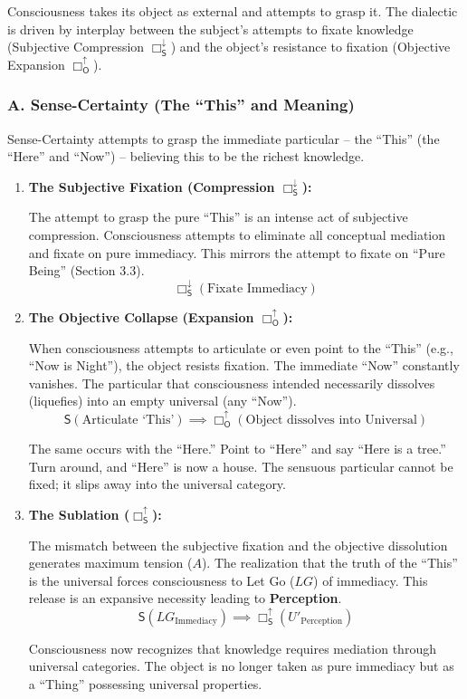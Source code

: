 \documentclass[12pt]{book}
\newcommand{\SBoxUp}{\Box_{\mathsf{S}}^{\uparrow}}
\newcommand{\SBoxDown}{\Box_{\mathsf{S}}^{\downarrow}}
\newcommand{\OBoxUp}{\Box_{\mathsf{O}}^{\uparrow}}
\begin{document}
Consciousness takes its object as external and attempts to grasp it. The dialectic is driven by interplay between the subject's attempts to fixate knowledge (Subjective Compression $\SBoxDown$) and the object's resistance to fixation (Objective Expansion $\OBoxUp$).

\subsubsection{A. Sense-Certainty (The ``This'' and Meaning)}

Sense-Certainty attempts to grasp the immediate particular -- the ``This'' (the ``Here'' and ``Now'') -- believing this to be the richest knowledge.

\begin{enumerate}
\item \textbf{The Subjective Fixation (Compression $\SBoxDown$):}

The attempt to grasp the pure ``This'' is an intense act of subjective compression. Consciousness attempts to eliminate all conceptual mediation and fixate on pure immediacy. This mirrors the attempt to fixate on ``Pure Being'' (Section 3.3).
\[
\SBoxDown(\text{Fixate Immediacy})
\]

\item \textbf{The Objective Collapse (Expansion $\OBoxUp$):}

When consciousness attempts to articulate or even point to the ``This'' (e.g., ``Now is Night''), the object resists fixation. The immediate ``Now'' constantly vanishes. The particular that consciousness intended necessarily dissolves (liquefies) into an empty universal (any ``Now'').
\[
\mathsf{S}(\text{Articulate `This'}) \implies \OBoxUp(\text{Object dissolves into Universal})
\]

The same occurs with the ``Here.'' Point to ``Here'' and say ``Here is a tree.'' Turn around, and ``Here'' is now a house. The sensuous particular cannot be fixed; it slips away into the universal category.

\item \textbf{The Sublation ($\SBoxUp$):}

The mismatch between the subjective fixation and the objective dissolution generates maximum tension ($A$). The realization that the truth of the ``This'' is the universal forces consciousness to Let Go ($LG$) of immediacy. This release is an expansive necessity leading to \textbf{Perception}.
\[
\mathsf{S}(LG_{\text{Immediacy}}) \implies \SBoxUp(U'_{\text{Perception}})
\]

Consciousness now recognizes that knowledge requires mediation through universal categories. The object is no longer taken as pure immediacy but as a ``Thing'' possessing universal properties.
\end{enumerate}
\end{document}
